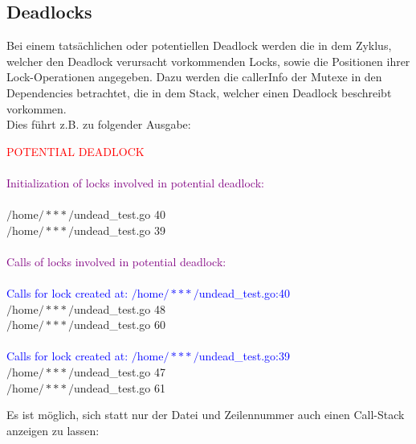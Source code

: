 \subsection{Deadlocks}
Bei einem tatsächlichen oder potentiellen Deadlock werden die in dem 
Zyklus, welcher den Deadlock verursacht vorkommenden Locks, sowie die Positionen
ihrer Lock-Operationen angegeben. Dazu werden die callerInfo der Mutexe in den 
Dependencies betrachtet, die in dem Stack, welcher einen Deadlock beschreibt 
vorkommen.\\
Dies führt z.B. zu folgender Ausgabe:
\begin{mdframed}
\textcolor{red}{POTENTIAL DEADLOCK}\\
\\
\textcolor{purple}{Initialization of locks involved in potential deadlock:}\\
\\
$/$home$/***/$undead\_test.go 40\\
$/$home$/***/$undead\_test.go 39\\
\\
\textcolor{purple}{Calls of locks involved in potential deadlock:}\\
\\
\textcolor{blue}{Calls for lock created at: $/$home$/***/$undead\_test.go:40}\\
$/$home$/***/$undead\_test.go 48\\
$/$home$/***/$undead\_test.go 60\\
\\
\textcolor{blue}{Calls for lock created at: $/$home$/***/$undead\_test.go:39}\\
$/$home$/***/$undead\_test.go 47\\
$/$home$/***/$undead\_test.go 61
\end{mdframed}
Es ist möglich, sich statt nur der Datei und Zeilennummer auch einen 
Call-Stack anzeigen zu lassen:
